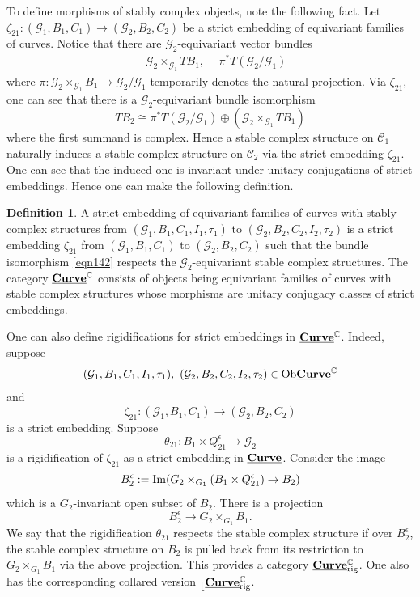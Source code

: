 \documentclass[reqno, 10pt]{amsart}
\numberwithin{equation}{section}
\numberwithin{equation}{section}
\theoremstyle{definition}
\newtheorem{defn}[thm]{Definition}
\theoremstyle{remark}
\newcommand{\beq}{\begin{equation}}
\newcommand{\eeq}{\end{equation}}
\newcommand{\beqn}{\begin{equation*}}
\newcommand{\eeqn}{\end{equation*}}
\newcommand{\mb}{\mathbb}
\newcommand{\mc}{\mathcal}
\renewcommand{\outer}{{}_{\lfloor}}
\newcommand{\uds}[1]{\underline{\smash{#1}}}
\begin{document}
To define morphisms of stably complex objects, note the following fact. Let $\zeta_{21}: ({\mc G}_1, B_1, C_1) \to ({\mc G}_2, B_2, C_2)$ be a strict embedding of equivariant families of curves. Notice that there are ${\mc G}_2$-equivariant vector bundles
    \begin{align*}
    &\ {\mc G}_2\times_{{\mc G}_1} TB_1,\ &\ \pi^* T({\mc G}_2/{\mc G}_1)
    \end{align*}
    where $\pi: {\mc G}_2\times_{{\mc G}_1} B_1 \to {\mc G}_2/{\mc G}_1$ temporarily denotes the natural projection. 
    Via $\zeta_{21}$, one can see that there is a ${\mc G}_2$-equivariant bundle isomorphism
    \beq\label{eqn142}
    TB_2 \cong \pi^* T({\mc G}_2/{\mc G}_1) \oplus ( {\mc G}_2 \times_{{\mc G}_1} TB_1)
    \eeq
    where the first summand is complex. Hence a stable complex structure on ${\mc C}_1$ naturally induces a stable complex structure on ${\mc C}_2$ via the strict embedding $\zeta_{21}$. One can see that the induced one is invariant under unitary conjugations of strict embeddings. Hence one can make the following definition.

\begin{defn}
A strict embedding of equivariant families of curves with stably complex structures from $({\mc G}_1, B_1, C_1, I_1, \tau_1)$ to $({\mc G}_2, B_2, C_2, I_2, \tau_2)$ is a strict embedding $\zeta_{21}$ from $({\mc G}_1, B_1, C_1)$ to $({\mc G}_2, B_2, C_2)$ such that the bundle isomorphism \eqref{eqn142} respects the ${\mc G}_2$-equivariant stable complex structures. The category $\uds{\bf Curve}^{\mb C}$ consists of objects being equivariant families of curves with stable complex structures whose morphisms are unitary conjugacy classes of strict embeddings. 
\end{defn}


One can also define rigidifications for strict embeddings in $\uds{\bf Curve}^{\mb C}$. Indeed, suppose
\beqn
({\mc G}_1, B_1, C_1, I_1, \tau_1),\ ({\mc G}_2, B_2, C_2, I_2, \tau_2) \in {\rm Ob} \uds{\bf Curve}^{\mb C}
\eeqn
and 
\beqn
\zeta_{21}: 
({\mc G}_1, B_1, C_1) \to ({\mc G}_2, B_2, C_2)
\eeqn
is a strict embedding. Suppose
\beqn
\theta_{21}: B_1 \times Q_{21}^\epsilon \to {\mc G}_2
\eeqn
is a rigidification of $\zeta_{21}$ as a strict embedding in $\uds{\bf Curve}$. Consider the image
\beqn
B_2^\epsilon:= {\rm Im}( G_2 \times_{G_1}( B_1 \times Q_{21}^\epsilon) \to B_2)
\eeqn
which is a $G_2$-invariant open subset of $B_2$. There is a projection
\beqn
B_2^\epsilon \to G_2\times_{G_1}B_1.
\eeqn
We say that the rigidification $\theta_{21}$ respects the stable complex structure if over $B_2^\epsilon$, the stable complex structure on $B_2$ is pulled back from its restriction to $G_2\times_{G_1} B_1$ via the above projection. This provides a category $\uds{\bf Curve}_{\rm rig}^{\mb C}$. One also has the corresponding collared version $\outer \uds{\bf Curve}_{\rm rig}^{\mb C}$.
\end{document}
